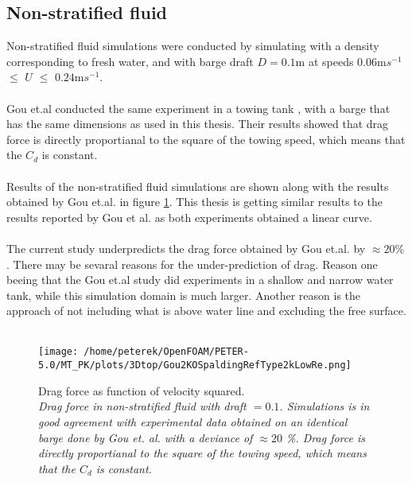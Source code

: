\documentclass[a4paper, 12pt]{report}
\begin{document}
\subsection{Non-stratified fluid}
Non-stratified fluid simulations were conducted by simulating with a density corresponding to fresh water, and with barge draft $D=0.1$m at speeds $0.06$m$s^{-1}$ $\leq$ $U$ $\leq$ $0.24$m$s^{-1}$. \\
\\
Gou et.al conducted the same experiment in a towing tank \cite{Gou}, with a barge that has the same dimensions as used in this thesis. Their results showed that drag force is directly proportianal to the square of the towing speed, which means that the $C_d$ is constant.\\
\\
Results of the non-stratified fluid simulations are shown along with the results obtained by Gou et.al. \cite{Gou} in figure \ref{fig:dragForce}. This thesis is getting similar results to the results reported by Gou et al.  as both experiments obtained a linear curve.\\
\\
The current study underpredicts the drag force obtained by Gou et.al. by $\approx 20\%$. There may be sevaral reasons for the under-prediction of drag. Reason one beeing that the Gou et.al study did experiments in a shallow and narrow water tank, while this simulation domain is much larger. Another reason is the approach of not including what is above water line and excluding the free surface. \\
\\
\begin{figure}[H]
	\centering
	\texttt{[image: /home/peterek/OpenFOAM/PETER-5.0/MT\_PK/plots/3Dtop/Gou2KOSpaldingRefType2kLowRe.png]}
	\caption{Drag force as function of velocity squared. \\ \textit{Drag force in non-stratified fluid with draft $=0.1$. Simulations is in good agreement with experimental data obtained on an identical barge done by Gou et. al. \cite{Gou} with a deviance of $\approx 20$ \%. Drag force is directly proportianal to the square of the towing speed, which means that the $C_d$ is constant. }}
	\label{fig:dragForce}
\end{figure}
\end{document}
